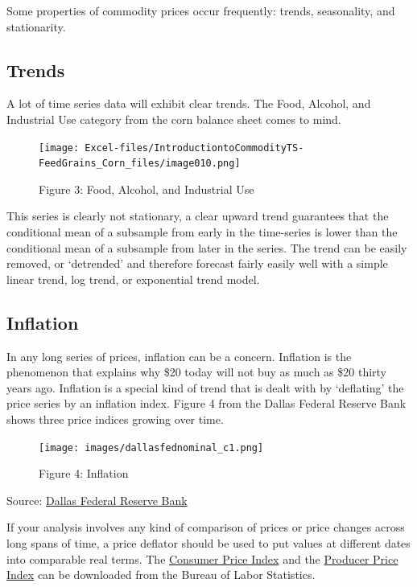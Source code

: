 \documentclass[
]{book}
\begin{document}
Some properties of commodity prices occur frequently: trends, seasonality, and stationarity.

\hypertarget{trends}{%
\subsection{Trends}\label{trends}}

A lot of time series data will exhibit clear trends. The Food, Alcohol, and Industrial Use category from the corn balance sheet comes to mind.

\begin{figure}
\centering
\texttt{[image: Excel-files/IntroductiontoCommodityTS-FeedGrains\_Corn\_files/image010.png]}
\caption{Figure 3: Food, Alcohol, and Industrial Use}
\end{figure}

This series is clearly not stationary, a clear upward trend guarantees that the conditional mean of a subsample from early in the time-series is lower than the conditional mean of a subsample from later in the series. The trend can be easily removed, or `detrended' and therefore forecast fairly easily well with a simple linear trend, log trend, or exponential trend model.

\hypertarget{inflation}{%
\subsection{Inflation}\label{inflation}}

In any long series of prices, inflation can be a concern. Inflation is the phenomenon that explains why \$20 today will not buy as much as \$20 thirty years ago. Inflation is a special kind of trend that is dealt with by `deflating' the price series by an inflation index. Figure 4 from the Dallas Federal Reserve Bank shows three price indices growing over time.

\begin{figure}
\centering
\texttt{[image: images/dallasfednominal\_c1.png]}
\caption{Figure 4: Inflation}
\end{figure}

Source: \href{http://www.dallasfed.org/research/basics/nominal.cfm}{Dallas Federal Reserve Bank}

If your analysis involves any kind of comparison of prices or price changes across long spans of time, a price deflator should be used to put values at different dates into comparable real terms. The \href{http://www.bls.gov/cpi/data.htm}{Consumer Price Index} and the \href{http://www.bls.gov/ppi/data.htm}{Producer Price Index} can be downloaded from the Bureau of Labor Statistics.
\end{document}
